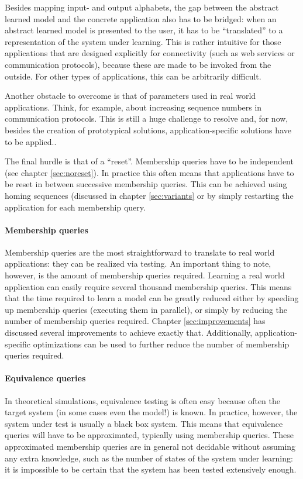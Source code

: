 \documentclass[multi,crop=false,class=article]{standalone}
\begin{document}
Besides mapping input- and output alphabets, the gap between the abstract
learned model and the concrete application also has to be bridged: when an
abstract learned model is presented to the user, it has to be ``translated'' to
a representation of the system under learning. This is rather intuitive for
those applications that are designed explicitly for connectivity (such as web
services or communication protocols), because these are made to be invoked from
the outside. For other types of applications, this can be arbitrarily difficult.

Another obstacle to overcome is that of parameters used in real world
applications. Think, for example, about increasing sequence numbers in
communication protocols. This is still a huge challenge to
resolve\cite{Steffen2011a} and, for now, besides the creation of prototypical
solutions\cite{Aarts2010,Shahbaz2007,Howar2010}, application-specific solutions have
to be applied.\cite{Steffen2011a}.

The final hurdle is that of a ``reset''. Membership queries have to be
independent (see chapter \cref{sec:noreset}). In practice this often means that
applications have to be reset in between successive membership queries. This can
be achieved using homing sequences\cite{Rivest1993} (discussed in chapter
\cref{sec:variants} or by simply restarting the application for each membership
query.

\paragraph{Membership queries} Membership queries are the most straightforward
to translate to real world applications: they can be realized via testing. An
important thing to note, however, is the amount of membership queries required.
Learning a real world application can easily require several thousand membership
queries. This means that the time required to learn a model
can be greatly reduced either by speeding up membership queries (executing them
in parallel), or simply by reducing the number of membership queries required.
Chapter \cref{sec:improvements} has discussed several improvements to achieve
exactly that. Additionally, application-specific optimizations can be used to
further reduce the number of membership queries required.

\paragraph{Equivalence queries} In theoretical simulations, equivalence testing
is often easy because often the target system (in some cases even the model!) is
known. In practice, however, the system under test is usually a black box
system. This means that equivalence queries will have to be approximated,
typically using membership queries. These approximated membership queries are in
general not decidable without assuming any extra knowledge\cite{Steffen2011a},
such as the number of states of the system under learning: it is impossible to
be certain that the system has been tested extensively enough.
\end{document}
